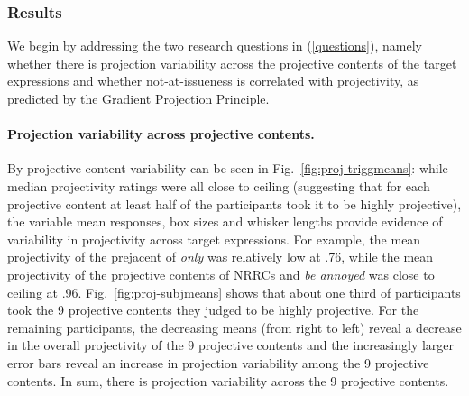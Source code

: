 \documentclass[11pt,fleqn]{article}
\newcommand{\6}{\mbox{$[\hspace*{-.6mm}[$}}
\newcommand{\9}{\mbox{$]\hspace*{-.6mm}]$}}
\newcommand{\figref}[1]{Fig.~\ref{#1}}
\begin{document}
\subsubsection{Results}

We begin by addressing the two research questions in (\ref{questions}), namely whether there is projection variability across the projective contents of the target expressions and whether not-at-issueness is correlated with projectivity, as predicted by the Gradient Projection Principle. 

\paragraph{Projection variability across projective contents.} By-projective content variability can be seen in \figref{fig:proj-triggmeans}:  while median projectivity ratings were all close to ceiling (suggesting that for each projective content at least half of the participants took it to be highly projective), the variable mean responses, box sizes and whisker lengths provide evidence of variability in projectivity across target expressions. For example, the mean projectivity of the prejacent of \emph{only} was relatively low at .76, while the mean projectivity of the projective contents of NRRCs and \emph{be annoyed} was close to ceiling at .96. \figref{fig:proj-subjmeans} shows that about one third of participants took the 9 projective contents they judged to be highly projective. For the remaining participants, the decreasing means (from right to left) reveal a decrease in the overall projectivity of the 9 projective contents and the increasingly larger error bars reveal an increase in projection variability among the 9 projective contents. In sum, there is projection variability across the 9 projective contents.
\end{document}
